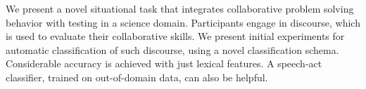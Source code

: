We present a novel situational task that integrates collaborative problem solving behavior with testing in a science domain. Participants engage in discourse, which is used to evaluate their collaborative skills. We present initial experiments for automatic classification of such discourse, using a novel classification schema. Considerable accuracy is achieved with just lexical features. A speech-act classifier, trained on out-of-domain data, can also be helpful.
